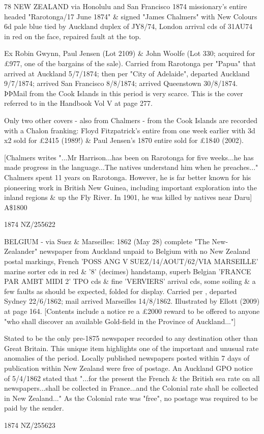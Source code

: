 \documentclass[justified]{tufte-book}
\begin{document}
%
{78
NEW ZEALAND
via Honolulu and San Francisco
1874 missionary's entire headed "Rarotonga/17 June 1874" \& signed "James Chalmers" with New Colours 6d pale blue tied by Auckland duplex of JY8/74, London arrival cds of 31AU74 in red on the face, repaired fault at the top. 

Ex Robin Gwynn, Paul Jensen (Lot 2109) \& John Woolfe (Lot 330; acquired for £977, one of the bargains of the sale). Carried from Rarotonga per "Papua" that arrived at Auckland 5/7/1874; then per "City of Adelaide", departed Auckland 9/7/1874; arrived San Francisco 8/8/1874; arrived Queenstown 30/8/1874. ÞÞMail from the Cook Islands in this period is very scarce. This is the cover referred to in the Handbook Vol V at page 277. 

Only two other covers - also from Chalmers - from the Cook Islands are recorded with a Chalon franking: Floyd Fitzpatrick's entire from one week earlier with 3d x2 sold for £2415 (1989!) \& Paul Jensen's 1870 entire sold for \pounds{1840} (2002). 

[Chalmers writes "...Mr Harrison...has been on Rarotonga for five weeks...he has made progress in the language...The natives understand him when he preaches..." Chalmers spent 11 years on Rarotonga. However, he is far better known for his pioneering work in British New Guinea, including important exploration into the inland regions \& up the Fly River. In 1901, he was killed by natives near Daru]	
A\$1800
}%
{1874}%
{NZ/255622}%
{}%
{}
{}%
{}

%
{BELGIUM - via Suez \& Marseilles: 1862 (May 28) complete "The New-Zealander" newspaper from Auckland unpaid to Belgium with no New Zealand postal markings, French 'POSS ANG V SUEZ/14/AOUT/62/VIA MARSEILLE' marine sorter cds in red \& '8' (decimes) handstamp, superb Belgian 'FRANCE PAR AMBT MIDI 2' TPO cds \& fine 'VERVIERS' arrival cds, some soiling \& a few faults as should be expected, folded for display. Carried per , departed Sydney 22/6/1862; mail arrived Marseilles 14/8/1862. Illustrated by Ellott (2009) at page 164. [Contents include a notice re a \pounds{2000} reward to be offered to anyone "who shall discover an available Gold-field in the Province of Auckland..."] 

Stated to be the only pre-1875 newspaper recorded to any destination other than Great Britain. This unique item highlights one of the important and unusual rate anomalies of the period. Locally published newspapers posted within 7 days of publication within New Zealand were free of postage. An Auckland GPO notice of 5/4/1862 stated that "...for the present the French \& the British sea rate on all newspapers...shall be collected in France...and the Colonial rate shall be collected in New Zealand..." As the Colonial rate was "free", no postage was required to be paid by the sender.
}%
{1874}%
{NZ/255623}%
{}%
{}
{}%
{}
\end{document}
